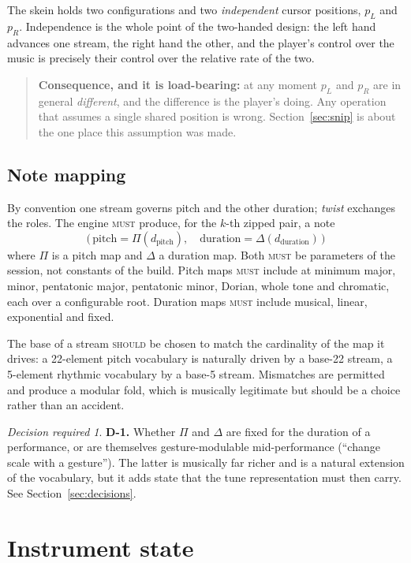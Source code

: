 \documentclass[11pt,a4paper]{article}
\newcommand{\MUST}{\textsc{must}}
\newcommand{\SHOULD}{\textsc{should}}
\theoremstyle{definition}
\theoremstyle{plain}
\theoremstyle{remark}
\newtheorem*{decision}{Decision required}
\begin{document}
The skein holds two configurations and two \emph{independent} cursor positions, $p_L$ and $p_R$.
Independence is the whole point of the two-handed design: the left hand advances one stream, the
right hand the other, and the player's control over the music is precisely their control over the
relative rate of the two.

\begin{quote}
\textbf{Consequence, and it is load-bearing:} at any moment $p_L$ and $p_R$ are in general
\emph{different}, and the difference is the player's doing. Any operation that assumes a single
shared position is wrong. Section~\ref{sec:snip} is about the one place this assumption was made.
\end{quote}

\subsection{Note mapping}

By convention one stream governs pitch and the other duration; \emph{twist} exchanges the roles.
The engine \MUST{} produce, for the $k$-th zipped pair, a note
\[
\big(\,\text{pitch} = \Pi(d_{\text{pitch}}),\quad
      \text{duration} = \Delta(d_{\text{duration}})\,\big)
\]
where $\Pi$ is a pitch map and $\Delta$ a duration map. Both \MUST{} be parameters of the session,
not constants of the build. Pitch maps \MUST{} include at minimum major, minor, pentatonic major,
pentatonic minor, Dorian, whole tone and chromatic, each over a configurable root. Duration maps
\MUST{} include musical, linear, exponential and fixed.

The base of a stream \SHOULD{} be chosen to match the cardinality of the map it drives: a
22-element pitch vocabulary is naturally driven by a base-22 stream, a 5-element rhythmic vocabulary
by a base-5 stream. Mismatches are permitted and produce a modular fold, which is musically
legitimate but should be a choice rather than an accident.

\begin{decision}
\textbf{D-1.} Whether $\Pi$ and $\Delta$ are fixed for the duration of a performance, or are
themselves gesture-modulable mid-performance (``change scale with a gesture''). The latter is
musically far richer and is a natural extension of the vocabulary, but it adds state that the tune
representation must then carry. See Section~\ref{sec:decisions}.
\end{decision}

\section{Instrument state}
\end{document}
